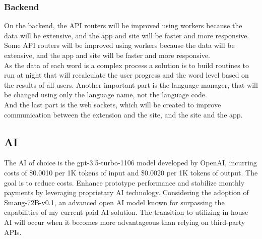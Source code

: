 \documentclass[12pt]{article}
\begin{document}
\subsubsection{Backend} 
On the backend, the API routers will be improved using workers because the data will be extensive, and the app and site will be faster and more responsive. \\
Some API routers will be improved using workers because the data will be extensive, and the app and site will be faster and more responsive. \\
As the data of each word is a complex process a solution is to build routines to run at night that will recalculate the user progress and the word level based on the results of all users.
Another important part is the language manager, that will be changed using only the language name, not the language code. \\
And the last part is the web sockets, which will be created to improve communication between the extension and the site, and the site and the app. 

\subsection{AI}
The AI of choice is the gpt-3.5-turbo-1106 model developed by OpenAI, incurring costs of \$0.0010 per 1K tokens of input and \$0.0020 per 1K tokens of output. The goal is to reduce costs. Enhance prototype performance and stabilize monthly payments by leveraging proprietary AI technology. Considering the adoption of Smaug-72B-v0.1, an advanced open AI model known for surpassing the capabilities of my current paid AI solution. The transition to utilizing in-house AI will occur when it becomes more advantageous than relying on third-party APIs.
\end{document}
